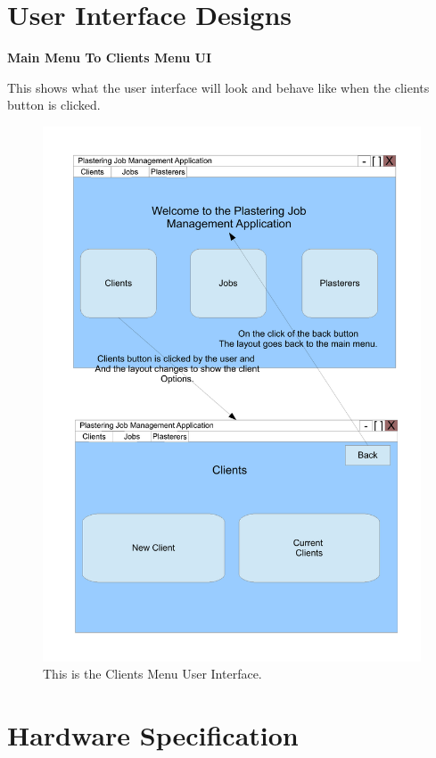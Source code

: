 \section{User Interface Designs}
\textbf{Main Menu To Clients Menu UI}
\begin{flushleft}
This shows what the user interface will look and behave like when the clients button is clicked.
\end{flushleft}
\begin{figure}[H]
\includegraphics[scale=0.5]{./Design/images/UI-ClientsMenu.pdf}
    \caption{This is the Clients Menu User Interface.} 
\label{fig:FlowChartClientsMenu}
\end{figure}

\section{Hardware Specification}

